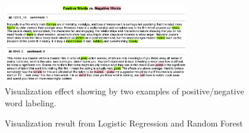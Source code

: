 \documentclass[12pt]{article}
\begin{document}
\begin{figure}\centering
\includegraphics[width=0.72\textwidth]{example.png}
\caption{Visualization effect showing by two examples of positive/negative word labeling.} \label{fig:temp_dose}
\end{figure}

\begin{figure}%
    \centering
    \qquad
    \caption{Visualization result from Logistic Regression and Random Forest }%
    \label{fig:example}%
\end{figure}
\end{document}
